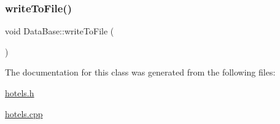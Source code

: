 \mbox{\label{class_data_base_ae099589c13d77b31a311fc0469250288}} 
\subsubsection{\texorpdfstring{write\+To\+File()}{writeToFile()}}
{\footnotesize\ttfamily void Data\+Base\+::write\+To\+File (\begin{DoxyParamCaption}{ }\end{DoxyParamCaption})\hspace{0.3cm}{\ttfamily [inline]}}



The documentation for this class was generated from the following files\+:\begin{DoxyCompactItemize}
\item 
\hyperlink{hotels_8h}{hotels.\+h}\item 
\hyperlink{hotels_8cpp}{hotels.\+cpp}\end{DoxyCompactItemize}
